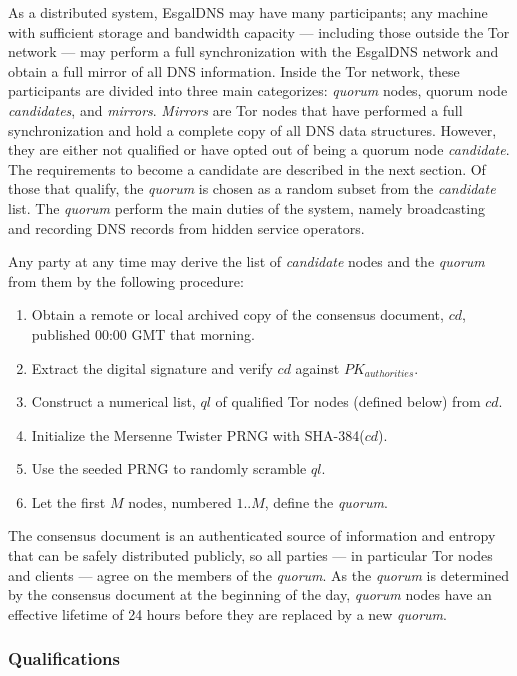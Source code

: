 As a distributed system, EsgalDNS may have many participants; any machine with sufficient storage and bandwidth capacity --- including those outside the Tor network --- may perform a full synchronization with the EsgalDNS network and obtain a full mirror of all DNS information. Inside the Tor network, these participants are divided into three main categorizes: \emph{quorum} nodes, quorum node \emph{candidates}, and \emph{mirrors}. \emph{Mirrors} are Tor nodes that have performed a full synchronization and hold a complete copy of all DNS data structures. However, they are either not qualified or have opted out of being a quorum node \emph{candidate}. The requirements to become a candidate are described in the next section. Of those that qualify, the \emph{quorum} is chosen as a random subset from the \emph{candidate} list. The \emph{quorum} perform the main duties of the system, namely broadcasting and recording DNS records from hidden service operators. 

Any party at any time may derive the list of \emph{candidate} nodes and the \emph{quorum} from them by the following procedure:

\begin{enumerate}
	\item Obtain a remote or local archived copy of the consensus document, $ cd $, published 00:00 GMT that morning.
	\item Extract the digital signature and verify $ cd $ against $ PK_{authorities} $.
	\item Construct a numerical list, $ ql $ of qualified Tor nodes (defined below) from $ cd $.
	\item Initialize the Mersenne Twister PRNG with SHA-384($ cd $).
	\item Use the seeded PRNG to randomly scramble $ ql $.
	\item Let the first $ M $ nodes, numbered $ 1 .. M $, define the \emph{quorum}.
\end{enumerate}

The consensus document is an authenticated source of information and entropy that can be safely distributed publicly, so all parties --- in particular Tor nodes and clients --- agree on the members of the \emph{quorum}. As the \emph{quorum} is determined by the consensus document at the beginning of the day, \emph{quorum} nodes have an effective lifetime of 24 hours before they are replaced by a new \emph{quorum}.

\subsubsection{Qualifications}


